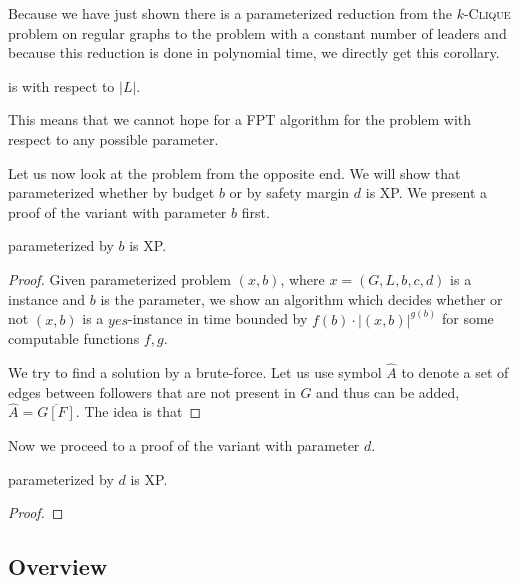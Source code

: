 Because we have just shown there is a parameterized reduction from the $k$-\textsc{Clique} problem on regular graphs to the
\HL problem with a constant number of leaders and because this reduction is done in polynomial time,
we directly get this corollary.

\begin{corollary}
    \HL is \pNPh with respect to $|L|$.
\end{corollary}
This means that we cannot hope for a FPT algorithm for the \HL problem with respect to any possible parameter. 

Let us now look at the problem from the opposite end.
We will show that \HL parameterized whether by budget $b$ or by safety margin $d$ is XP.
We present a proof of the variant with parameter $b$ first.

\begin{theorem}
    \HL parameterized by $b$ is XP.
\end{theorem}

\begin{proof}
    Given parameterized problem $(x, b)$, where $x = (G, L, b, c, d)$ is a \HLdeg instance and $b$ is the parameter,
    we show an algorithm which decides whether or not $(x, b)$ is a $yes$-instance in time bounded by
    $f(b) \cdot |(x, b)|^{g(b)}$ for some computable functions $f,g$.

    We try to find a solution by a brute-force.
    Let us use symbol $\hat{A}$ to denote a set of edges between followers that are not present in $G$ and
    thus can be added, $\hat{A} = \overline{G[F]}$.
    The idea is that 
\end{proof}


Now we proceed to a proof of the variant with parameter $d$.

\begin{theorem}
    \HL parameterized by $d$ is XP.
\end{theorem}

\begin{proof}
\end{proof}


\subsection{Overview}

\label{lem:allHDG:FPT:ColorsSize}
\label{lem:allHDGNash:XP:ColorsStrongNum}
\label{lem:allHDG:XP:ColorsTypes}
\label{lem:allHDGNash:XP:ColorsWeakNum}
\label{lem:allHDG:NPh:TypesNum}
\label{lem:allHDG:NPh:SizeTypes}
\label{lem:allHDG:FPT:StrongNumSize}
\label{lem:allHDG:XP:WeakNumSize}
\label{lem:allHDG:Wh:ColorsNumTypes}
\label{lem:allHDG:Wh:SizeTypeNum}

